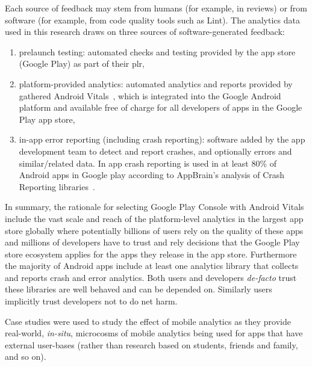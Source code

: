 Each source of feedback may stem from humans (for example, in reviews) or from software (for example, from code quality tools such as Lint). The analytics data used in this research draws on three sources of software-generated feedback:
\begin{enumerate}
    \item prelaunch testing: automated checks and testing provided by the app store (Google Play) as part of their \gls{plr},
    \item platform-provided analytics: automated analytics and reports provided by gathered Android Vitals~, which is integrated into the Google Android platform and available free of charge for all developers of apps in the Google Play app store,
    \item in-app error reporting (including crash reporting): software added by the app development team to detect and report crashes, and optionally errors and similar/related data. In app crash reporting is used in at least 80\% of Android apps in Google play according to AppBrain's analysis of Crash Reporting libraries~.
\end{enumerate}


In summary, the rationale for selecting Google Play Console with Android Vitals include the vast scale and reach of the platform-level analytics in the largest app store globally where potentially billions of users rely on the quality of these apps and millions of developers have to trust and rely decisions that the Google Play store ecosystem applies for the apps they release in the app store. Furthermore the majority of Android apps include at least one analytics library that collects and reports crash and error analytics. Both users and developers \emph{de-facto} trust these libraries are well behaved and can be depended on. Similarly users implicitly trust developers not to do net harm. 

Case studies were used to study the effect of mobile analytics as they provide real-world, \emph{in-situ}, microcosms of mobile analytics being used for apps that have external user-bases (rather than research based on students, friends and family, and so on). 


